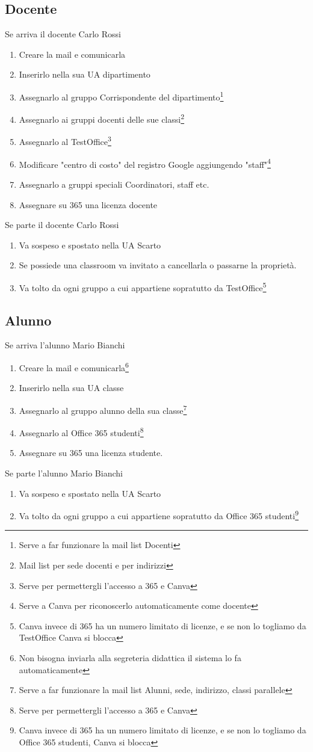 \subsection*{Docente}
Se arriva il docente Carlo Rossi
\begin{enumerate}
	\item Creare la mail e comunicarla
	\item Inserirlo nella  sua UA dipartimento
	\item Assegnarlo  al gruppo Corrispondente del dipartimento\footnote{Serve a far funzionare la mail list Docenti}
	\item Assegnarlo ai gruppi docenti delle sue classi\footnote{Mail list per sede docenti e per indirizzi}
	\item Assegnarlo al  TestOffice\footnote{Serve per permettergli l'accesso a 365 e Canva}
	\item Modificare "centro di costo" del registro Google aggiungendo "staff"\footnote{Serve a Canva per riconoscerlo automaticamente come docente}
	\item Assegnarlo a gruppi speciali Coordinatori, staff etc.
	\item Assegnare  su 365 una licenza docente
\end{enumerate}
Se  parte il docente Carlo Rossi
\begin{enumerate}
	\item Va sospeso e spostato nella UA Scarto
	\item Se possiede una classroom va invitato a cancellarla o passarne la proprietà.
	\item Va tolto da ogni gruppo a cui appartiene sopratutto da  TestOffice\footnote{Canva invece di 365 ha un numero limitato di licenze, e se non lo togliamo da TestOffice Canva si blocca}
\end{enumerate}
\subsection*{Alunno}
Se arriva l'alunno Mario Bianchi
\begin{enumerate}
	\item Creare la mail e comunicarla\footnote{Non bisogna inviarla alla segreteria didattica il sistema lo fa automaticamente}
	\item Inserirlo nella  sua UA classe
	\item Assegnarlo  al gruppo alunno della sua classe\footnote{Serve a far funzionare la mail list Alunni, sede, indirizzo, classi parallele}
	\item Assegnarlo al  Office 365 studenti\footnote{Serve per permettergli l'accesso a 365 e Canva}
	\item Assegnare  su 365 una licenza studente.
\end{enumerate}
Se  parte l'alunno Mario Bianchi
\begin{enumerate}
	\item Va sospeso e spostato nella UA Scarto
	\item Va tolto da ogni gruppo a cui appartiene sopratutto da  Office 365 studenti\footnote{Canva invece di 365 ha un numero limitato di licenze, e se non lo togliamo da Office 365 studenti, Canva si blocca}
\end{enumerate}